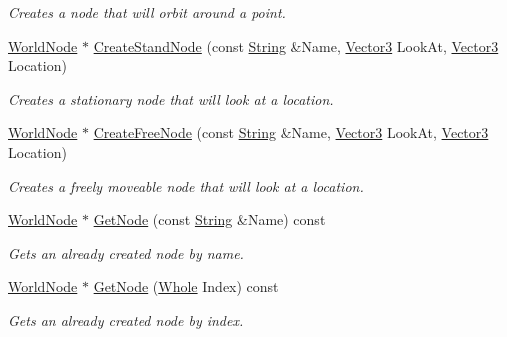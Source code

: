 \begin{DoxyCompactItemize}
\begin{DoxyCompactList}\small\item\em Creates a node that will orbit around a point. \item\end{DoxyCompactList}\item 
\hyperlink{classphys_1_1WorldNode}{WorldNode} $\ast$ \hyperlink{classphys_1_1SceneManager_afb93b25cdd669066481e7bc81c33674a}{CreateStandNode} (const \hyperlink{namespacephys_aa03900411993de7fbfec4789bc1d392e}{String} \&Name, \hyperlink{classphys_1_1Vector3}{Vector3} LookAt, \hyperlink{classphys_1_1Vector3}{Vector3} Location)
\begin{DoxyCompactList}\small\item\em Creates a stationary node that will look at a location. \item\end{DoxyCompactList}\item 
\hyperlink{classphys_1_1WorldNode}{WorldNode} $\ast$ \hyperlink{classphys_1_1SceneManager_a897bd134ca9ddfda33595291ebb7a75e}{CreateFreeNode} (const \hyperlink{namespacephys_aa03900411993de7fbfec4789bc1d392e}{String} \&Name, \hyperlink{classphys_1_1Vector3}{Vector3} LookAt, \hyperlink{classphys_1_1Vector3}{Vector3} Location)
\begin{DoxyCompactList}\small\item\em Creates a freely moveable node that will look at a location. \item\end{DoxyCompactList}\item 
\hyperlink{classphys_1_1WorldNode}{WorldNode} $\ast$ \hyperlink{classphys_1_1SceneManager_a30fb2074edc5191826aa2b0fb4d943a6}{GetNode} (const \hyperlink{namespacephys_aa03900411993de7fbfec4789bc1d392e}{String} \&Name) const 
\begin{DoxyCompactList}\small\item\em Gets an already created node by name. \item\end{DoxyCompactList}\item 
\hyperlink{classphys_1_1WorldNode}{WorldNode} $\ast$ \hyperlink{classphys_1_1SceneManager_ad7359bdccd992f34fff901b213825db6}{GetNode} (\hyperlink{namespacephys_a460f6bc24c8dd347b05e0366ae34f34a}{Whole} Index) const 
\begin{DoxyCompactList}\small\item\em Gets an already created node by index. \item\end{DoxyCompactList}\item 

\end{DoxyCompactItemize}
